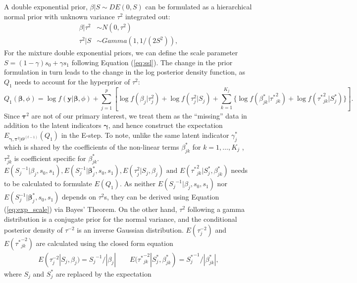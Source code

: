 \documentclass[AMA,STIX1COL,]{WileyNJD-v2}
\begin{document}
A double exponential prior, \(\beta|S \sim DE(0, S)\) can be formulated
as a hierarchical normal prior with unknown variance \(\tau^2\)
integrated out: \begin{align*}
  \beta|\tau^2 &\sim N(0, \tau^2)\\
  \tau^2|S & \sim Gamma(1, 1/(2S^2)), 
\end{align*} For the mixture double exponential priors, we can define
the scale parameter \(S = (1-\gamma)s_0 + \gamma s_1\) following
Equation (\ref{eq:ssl}). The change in the prior formulation in turn
leads to the change in the log posterior density function, as \(Q_1\)
needs to account for the hyperprior of \(\tau^2\):
\begin{equation}\label{eq:Q1_IWLS}
Q_1(\boldsymbol{\beta}, \phi) = \log f(\textbf{y}|\boldsymbol{\beta}, \phi) + \sum\limits_{j=1}^p\left[\log f(\beta_j|{\tau}^2_j) + \log f({\tau}^2_j| S_j)+\sum\limits_{k=1}^{K_j} \{\log f(\beta^{*}_{jk}|{\tau^{*}}^2_{jk})+\log f({\tau^*}^2_{jk}| S^*_j)\}\right].
\end{equation} Since \(\boldsymbol{\tau}^2\) are not of our primary
interest, we treat them as the ``missing'' data in addition to the
latent indicators \(\boldsymbol{\gamma}\), and hence construct the
expectation
\(E_{\boldsymbol{\gamma}, \boldsymbol{\tau}^2|\Theta^{(t-1)}}(Q_1)\) in
the E-step. To note, unlike the same latent indicator \(\gamma^*_j\)
which is shared by the coefficients of the non-linear terms
\(\beta^*_{jk}\) for \(k = 1, \dots, K_j\) , \(\tau^2_{jk}\) is
coefficient specific for \(\beta^*_{jk}\).
\(E({S_j}^{-1}|\beta_j, s_0, s_1), E(S^{-1}_j|\boldsymbol{\beta}_j^*, s_0, s_1), E({\tau}^2_{j}|S_j, \beta_j) \text{ and } E({\tau^*}^2_{jk}|S_j^*, \beta^*_{jk})\)
needs to be calculated to formulate \(E(Q_1)\). As neither
\(E({S_j}^{-1}|\beta_j, s_0, s_1)\) nor
\(E(S^{-1}_j|\boldsymbol{\beta}_j^*, s_0, s_1)\) depends on \(\tau^2\)s,
they can be derived using Equation (\ref{eq:exp_scale}) via Bayes'
Theorem. On the other hand, \(\tau^{2}\) following a gamma distribution
is a conjugate prior for the normal variance, and the conditional
posterior density of \(\tau^{-2}\) is an inverse Gaussian distribution.
\(E({\tau}^{-2}_{j})\) and \(E({\tau^*}^{-2}_{jk})\) are calculated
using the closed form equation \begin{align*}
 E({\tau}^{-2}_{j}|S_j, \beta_j) ={S_j}^{-1}/|\beta_j| \qquad E({\tau^*}^{-2}_{jk}|S_j^*, \beta^*_{jk})={S_j^*}^{-1}/|\beta^*_{jk}|,
\end{align*} where \(S_j\) and \(S_j^*\) are replaced by the expectation
\end{document}

